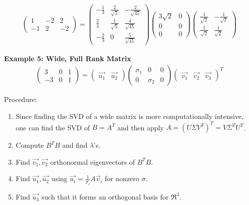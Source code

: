 \begin{align}
    \begin{pmatrix}
        1 & -2 & 2 \\ -1 & 2 & -2
    \end{pmatrix} = \begin{pmatrix}
        -\frac{1}{3} & \frac{2}{\sqrt{5}} & -\frac{2}{\sqrt{45}} \\ \frac{2}{3} & \frac{1}{\sqrt{5}} & \frac{4}{\sqrt{45}} \\ -\frac{2}{3} & 0 & \frac{5}{\sqrt{45}}
    \end{pmatrix}
    \begin{pmatrix}
        3\sqrt{2} & 0 \\ 0 & 0 \\ 0 & 0
    \end{pmatrix} \begin{pmatrix}
        \frac{1}{\sqrt{2}} & -\frac{1}{\sqrt{2}} \\
        \frac{1}{\sqrt{2}} & \frac{1}{\sqrt{2}}
    \end{pmatrix}
\end{align}

\noindent
\newline
\textbf{Example 5: Wide, Full Rank Matrix}
\begin{align}
    \begin{pmatrix}
        3 & 0 & 1 \\ -3 & 0 & 1
    \end{pmatrix} = \begin{pmatrix}
        \Vec{u_1} & \Vec{u_2}
    \end{pmatrix} \begin{pmatrix}
        \sigma_1 & 0 & 0 \\ 0 & \sigma_2 & 0
    \end{pmatrix} \begin{pmatrix}
        \Vec{v_1} & \Vec{v_2} & \Vec{v_3}
    \end{pmatrix}^T
\end{align}

\noindent
Procedure:
\begin{enumerate}
    \item Since finding the SVD of a wide matrix is more computationally intensive, one can find the SVD of \(B=A^T\) and then apply \(A = (U \Sigma V^T)^T = V \Sigma^T U^T\).
    \item Compute \(B^T B\) and find \(\lambda\)'s.
    \item Find \(\Vec{v_1}, \Vec{v_2}\) orthonormal eigenvectors of \(B^T B\).
    \item Find \(\Vec{u_1}, \Vec{u_2}\) using \(\Vec{u_i} = \frac{1}{\sigma_i} A\Vec{v}_i\) for nonzero \(\sigma\).
    \item Find \(\Vec{u_3}\) such that it forms an orthogonal basis for \(\Re^3\).
\end{enumerate}

